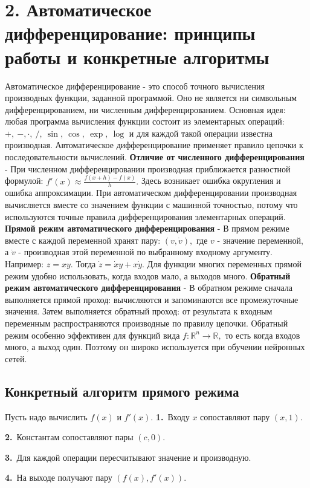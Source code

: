 \documentclass[12pt,a4paper]{article}
\begin{document}
\section{2. Автоматическое дифференцирование: принципы работы и конкретные алгоритмы}
Автоматическое дифференцирование - это способ точного вычисления производных функции, заданной программой. Оно не является ни символьным дифференцированием, ни численным дифференцированием.
Основная идея: любая программа вычисления функции состоит из элементарных операций: $+,\ -, \cdot,\ /,\ \sin,\ \cos,\ \exp,\ \log$
и для каждой такой операции известна производная. Автоматическое дифференцирование применяет правило цепочки к последовательности вычислений.
\textbf{Отличие от численного дифференцирования} - При численном дифференцировании производная приближается разностной формулой: $f'(x) \approx \frac{f(x+h)-f(x)}{h}.$
Здесь возникает ошибка округления и ошибка аппроксимации.
При автоматическом дифференцировании производная вычисляется вместе со значением функции с машинной точностью, потому что используются точные правила дифференцирования элементарных операций.
\textbf{Прямой режим автоматического дифференцирования} - В прямом режиме вместе с каждой переменной хранят пару: $(v, \dot v),$
где $v$ - значение переменной, а $\dot v$ - производная этой переменной по выбранному входному аргументу.
Например: $z = x y.$
Тогда $\dot z = \dot x y + x \dot y.$
Для функции многих переменных прямой режим удобно использовать, когда входов мало, а выходов много.
\textbf{Обратный режим автоматического дифференцирования} - В обратном режиме сначала выполняется прямой проход: вычисляются и запоминаются все промежуточные значения.
Затем выполняется обратный проход: от результата к входным переменным распространяются производные по правилу цепочки.
Обратный режим особенно эффективен для функций вида $f:\mathbb{R}^n \to \mathbb{R},$
то есть когда входов много, а выход один. Поэтому он широко используется при обучении нейронных сетей.
\subsection{Конкретный алгоритм прямого режима}
Пусть надо вычислить $f(x)$ и $f'(x)$.
\noindent\textbf{1.}\ Входу $x$ сопоставляют пару $(x,1)$.\par
\noindent\textbf{2.}\ Константам сопоставляют пары $(c,0)$.\par
\noindent\textbf{3.}\ Для каждой операции пересчитывают значение и производную.\par
\noindent\textbf{4.}\ На выходе получают пару $(f(x), f'(x))$.\par
\end{document}
